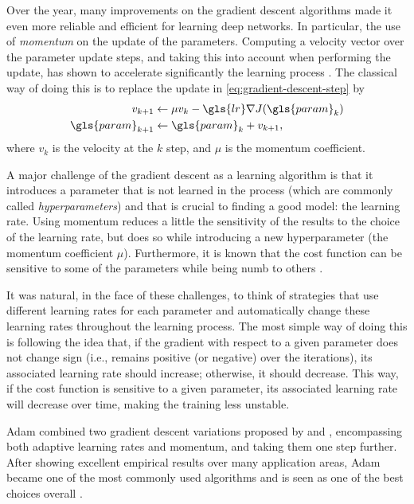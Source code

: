 Over the year, many improvements on the gradient descent algorithms made it even more reliable and efficient for learning deep networks.
In particular, the use of \textit{momentum} on the update of the parameters.
Computing a velocity vector over the parameter update steps, and taking this into account when performing the update, has shown to accelerate significantly the learning process \cite{sutskever_importance_2013}.
The classical way of doing this is to replace the update in \eqref{eq:gradient-descent-step} by
\begin{align*}
    v_{k+1} &\gets \mu v_k - \gls{lr} \nabla J(\gls{param}_k) \\
    \gls{param}_{k+1} &\gets \gls{param}_k + v_{k+1}
,\end{align*}
where $v_k$ is the velocity at the $k$ step, and $\mu$ is the momentum coefficient.

A major challenge of the gradient descent as a learning algorithm is that it introduces a parameter that is not learned in the process (which are commonly called \emph{hyperparameters}) and that is crucial to finding a good model: the learning rate.
Using momentum reduces a little the sensitivity of the results to the choice of the learning rate, but does so while introducing a new hyperparameter (the momentum coefficient $\mu$).
Furthermore, it is known that the cost function can be sensitive to some of the parameters while being numb to others \cite{goodfellow_deep_2016}.

It was natural, in the face of these challenges, to think of strategies that use different learning rates for each parameter and automatically change these learning rates throughout the learning process.
The most simple way of doing this is following the idea that, if the gradient with respect to a given parameter does not change sign (i.e., remains positive (or negative) over the iterations), its associated learning rate should increase; otherwise, it should decrease.
This way, if the cost function is sensitive to a given parameter, its associated learning rate will decrease over time, making the training less unstable.

Adam\cite{kingma_adam_2015} combined two gradient descent variations proposed by \textcite{duchi_adaptive_2011} and \textcite{tieleman_lecture_2012}, encompassing both adaptive learning rates and momentum, and taking them one step further.
After showing excellent empirical results over many application areas, Adam became one of the most commonly used algorithms and is seen as one of the best choices overall \cite{ruder_overview_2017}.

